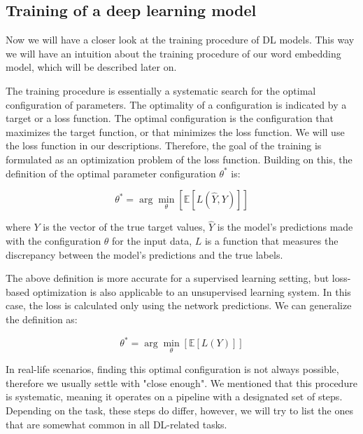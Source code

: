 \subsection{Training of a deep learning model}

Now we will have a closer look at the training procedure of \ac{DL} models. This way we will have an intuition about the training procedure of our word embedding model, which will be described later on.

The training procedure is essentially a systematic search for the optimal configuration of parameters. The optimality of a configuration is indicated by a target or a loss function. The optimal configuration is the configuration that maximizes the target function, or that minimizes the loss function. We will use the loss function in our descriptions. Therefore, the goal of the training is formulated as an optimization problem of the loss function. Building on this, the definition of the optimal parameter configuration \(\theta^*\) is:

\[ \theta^* = \arg\min_\theta \left[ \mathbb{E}[L(\hat{Y}, Y)] \right] \]

\noindent
where \(Y\) is the vector of the true target values, \(\hat{Y}\) is the model's predictions made with the configuration \(\theta\) for the input data, \(L\) is a function that measures the discrepancy between the model's predictions and the true labels.

The above definition is more accurate for a supervised learning setting, but loss-based optimization is also applicable to an unsupervised learning system. In this case, the loss is calculated only using the network predictions. We can generalize the definition as:

\[ \theta^* = \arg\min_\theta \left[ \mathbb{E}[L(Y)] \right] \]

In real-life scenarios, finding this optimal configuration is not always possible, therefore we usually settle with "close enough". We mentioned that this procedure is systematic, meaning it operates on a pipeline with a designated set of steps. Depending on the task, these steps do differ, however, we will try to list the ones that are somewhat common in all \ac{DL}-related tasks.

